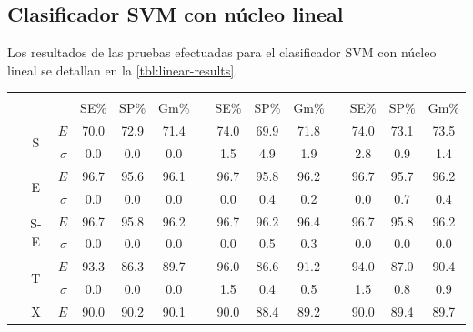\documentclass[12pt,bibliography=oldstyle,DIV=12,parskip=half-]{scrreprt}
\begin{document}
\subsection{Clasificador SVM con núcleo lineal}
%
Los resultados de las pruebas efectuadas para el clasificador SVM con núcleo lineal se
detallan en la \autoref{tbl:linear-results}.
%
\newcommand{\tE}{&{\footnotesize $E$}&}
\newcommand{\tF}[1]{\multirow{2}{*}{#1}\tE}
\newcommand{\tZ}{&{\footnotesize $\sigma$}&}
\newcommand{\tA}{\addlinespace[4pt]}
%

%
\begin{table}[h]
  \newcommand{\ti}[1]{\scriptsize #1}
  \footnotesize\center\sffamily
  \begin{tabular}{ccrSSScSSScSSS}
    \toprule
     &  & &
     &&
     &&
    \\
    \cmidrule(lr){4-6}\cmidrule(lr){8-10}\cmidrule(lr){12-14} & & &
    \ti{SE\%} & \ti{SP\%} & \ti{Gm\%} &&
    \ti{SE\%} & \ti{SP\%} & \ti{Gm\%} &&
    \ti{SE\%} & \ti{SP\%} & \ti{Gm\%}
    \\
    \midrule
&\tF{S}   70.0 & 72.9 & 71.4 && 74.0 & 69.9 & 71.8 && 74.0 & 73.1 & 73.5 \\
&\tZ       0.0 &  0.0 &  0.0 &&  1.5 &  4.9 &  1.9 &&  2.8 &  0.9 &  1.4 \\\tA
&\tF{E}   96.7 & 95.6 & 96.1 && 96.7 & 95.8 & 96.2 && 96.7 & 95.7 & 96.2 \\
&\tZ       0.0 &  0.0 &  0.0 &&  0.0 &  0.4 &  0.2 &&  0.0 &  0.7 &  0.4 \\\tA
&\tF{S-E} 96.7 & 95.8 & 96.2 && 96.7 & 96.2 & 96.4 && 96.7 & 95.8 & 96.2 \\
&\tZ       0.0 &  0.0 &  0.0 &&  0.0 &  0.5 &  0.3 &&  0.0 &  0.0 &  0.0 \\\tA
&\tF{T}   93.3 & 86.3 & 89.7 && 96.0 & 86.6 & 91.2 && 94.0 & 87.0 & 90.4 \\
&\tZ       0.0 &  0.0 &  0.0 &&  1.5 &  0.4 &  0.5 &&  1.5 &  0.8 &  0.9 \\\tA
&\tF{X}   90.0 & 90.2 & 90.1 && 90.0 & 88.4 & 89.2 && 90.0 & 89.4 & 89.7 \\

\end{tabular}
\end{table}
\end{document}
